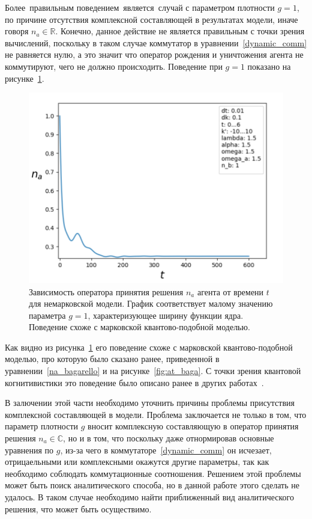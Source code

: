 Более~правильным поведением~является~случай с параметром плотности $g = 1$, по причине отсутствия
комплексной составляющей в результатах модели, иначе говоря $n_{a} \in \mathbb{R}$.
Конечно, данное действие не является правильным с точки зрения вычислений, поскольку в таком случае
коммутатор в уравнении~\eqref{dynamic_comm} не равняется нулю, а это значит что оператор рождения и
уничтожения агента не коммутируют, чего не должно происходить.
Поведение при $g = 1$ показано на рисунке~\ref{fig:fr_real_g_15}.
\begin{figure}[h!]
    \centering
    \captionsetup{justification=centering}
    \includegraphics[width=0.7\linewidth]{pictures/result_first_4.png}
    \caption{Зависимость оператора принятия решения $n_{a}$ агента от времени $t$ для немарковской модели.
    График соответствует малому значению параметра $g = 1$, характеризующее ширину функции ядра.
    Поведение схоже с марковской квантово-подобной моделью.}
    \label{fig:fr_real_g_15}
\end{figure}
Как видно из рисунка~\ref{fig:fr_real_g_15} его поведение схоже с марковской квантово-подобной моделью,
про которую было сказано ранее, приведенной в уравнении~\eqref{na_bagarello} и на рисунке~\ref{fig:at_baga}.
С точки зрения квантовой когнитивистики это поведение было описано ранее в других
работах~\citep{bagarello2015quantum,bagarello2018quantum}.

В залючении этой части необходимо уточнить причины проблемы присутствия комплексной составляющей в модели.
Проблема заключается не только в том, что параметр плотности $g$ вносит комплексную составляющую в оператор
принятия решения $n_{a} \in \mathbb{C}$, но и в том, что поскольку даже отнормировав основные уравнения
по $g$, из-за чего в коммутаторе~\eqref{dynamic_comm} он исчезает, отрицаельными или комплексными окажутся
другие параметры, так как необходимо соблюдать коммутационные соотношения.
Решением этой проблемы может быть поиск аналитического способа, но в данной работе этого сделать не удалось.
В таком случае необходимо найти приближенный вид аналитического решения, что может быть осуществимо.

